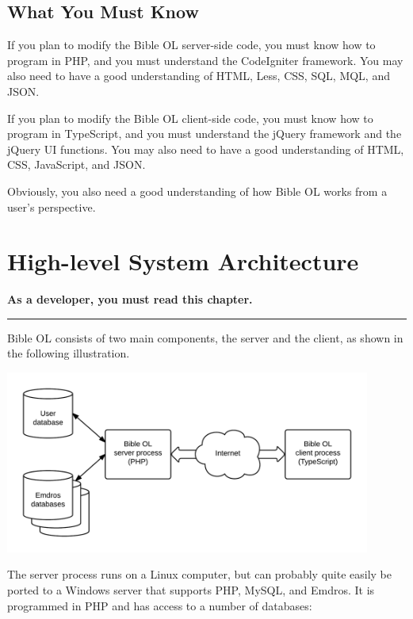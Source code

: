 \documentclass[11pt,oneside,a4paper]{memoir}
\begin{document}
\section{What You Must Know}

If you plan to modify the Bible OL server-side code, you must know how to program in PHP, and you
must understand the CodeIgniter framework. You may also need to have a good understanding of HTML,
Less, CSS, SQL, MQL, and JSON.

If you plan to modify the Bible OL client-side code, you must know how to program in TypeScript, and
you must understand the jQuery framework and the jQuery UI functions. You may also need to have a
good understanding of HTML, CSS, JavaScript, and JSON.

Obviously, you also need a good understanding of how Bible OL works from a user's perspective.


\chapter{High-level System Architecture}

\textbf{As a developer, you must read this chapter.}

\plainbreak{3}

Bible OL consists of two main components, the server and the client, as shown in the following illustration.

\begin{center}
  \includegraphics[width=0.9\textwidth]{BOL_overview.png}
\end{center}

The server process runs on a Linux computer, but can probably quite easily be ported to a Windows server
that supports PHP, MySQL, and Emdros. It is programmed in PHP and has access to a number of
databases:
\end{document}
